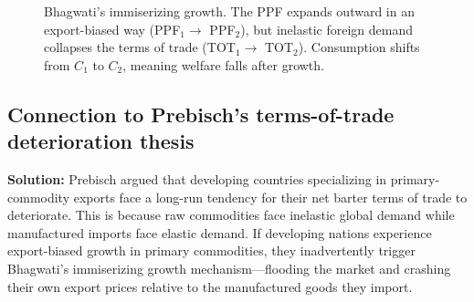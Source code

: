 \documentclass[11pt, letterpaper]{article}
\begin{document}
\begin{figure}[H]
  \caption{Bhagwati's immiserizing growth. The PPF expands outward in an export-biased way (PPF$_1 \to$ PPF$_2$), but inelastic foreign demand collapses the terms of trade (TOT$_1 \to$ TOT$_2$). Consumption shifts from $C_1$ to $C_2$, meaning welfare falls after growth.}
\end{figure}

\subsection*{Connection to Prebisch's terms-of-trade deterioration thesis}
\noindent \textbf{Solution:} Prebisch argued that developing countries specializing in primary-commodity exports face a long-run tendency for their net barter terms of trade to deteriorate. This is because raw commodities face inelastic global demand while manufactured imports face elastic demand. If developing nations experience export-biased growth in primary commodities, they inadvertently trigger Bhagwati's immiserizing growth mechanism---flooding the market and crashing their own export prices relative to the manufactured goods they import.
\end{document}
